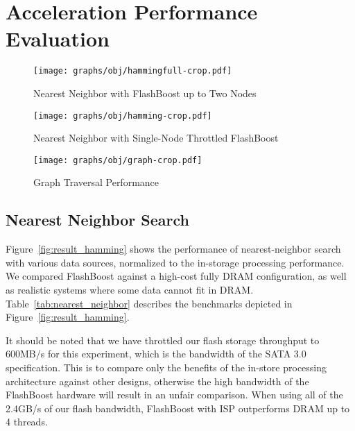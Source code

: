 \section{Acceleration Performance Evaluation}
\label{sec:results_acceleration}

\begin{figure*}[ht]
\centering
\vspace{0pt}
\begin{minipage}[c]{.3\textwidth}
	\texttt{[image: graphs/obj/hammingfull-crop.pdf]}
	\caption{Nearest Neighbor with FlashBoost up to Two Nodes}
	\label{fig:result_hammingfull}
\end{minipage}\hfill
\vspace{0pt}
\begin{minipage}[c]{.3\textwidth}
	\texttt{[image: graphs/obj/hamming-crop.pdf]}
	\caption{Nearest Neighbor with Single-Node Throttled FlashBoost}
	\label{fig:result_hamming}
\end{minipage}\hfill
\vspace{0pt}
\begin{minipage}[c]{.3\textwidth}
	\texttt{[image: graphs/obj/graph-crop.pdf]}
	\caption{Graph Traversal Performance}
	\label{fig:result_graph}
\end{minipage}
\end{figure*}

\subsection{Nearest Neighbor Search}

Figure~\ref{fig:result_hamming} shows the performance of nearest-neighbor search
with various data sources, normalized to the in-storage processing performance.
We compared FlashBoost against a high-cost fully DRAM configuration, as well as
realistic systems where some data cannot fit in DRAM.
Table~\ref{tab:nearest_neighbor} describes the benchmarks depicted in
Figure~\ref{fig:result_hamming}.

It should be noted that we have throttled our flash storage throughput to
600MB/s for this experiment, which is the bandwidth of the SATA 3.0
specification. This is to compare only the benefits of the in-store processing
architecture against other designs, otherwise the high bandwidth of the
FlashBoost hardware will result in an unfair comparison. When using all of the
2.4GB/s of our flash bandwidth, FlashBoost with ISP outperforms DRAM up to 4 threads.

